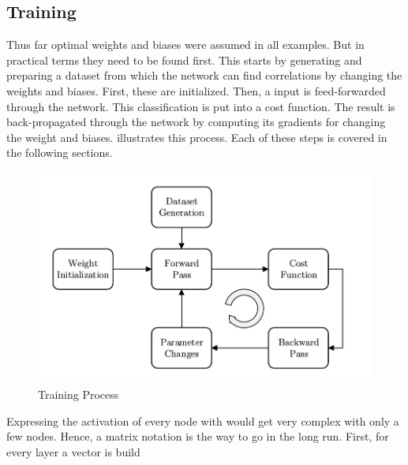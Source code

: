\subsection{Training}
\label{sec:neural-networks-training}
Thus far optimal weights and biases were assumed in all examples.
But in practical terms they need to be found first.
This starts by generating and preparing a dataset from which the network can find correlations by changing the weights and biases.
First, these are initialized.
Then, a input is feed-forwarded through the network.
This classification is put into a cost function.
The result is back-propagated through the network by computing its gradients for changing the weight and biases.
 illustrates this process.
Each of these steps is covered in the following sections.

\begin{figure}
	\centering
	\includegraphics{images/training.pdf}
	\caption[Training Process]{Training Process}
	\label{fig:training}
\end{figure}






Expressing the activation of every node with  would get very complex with only a few nodes.
Hence, a matrix notation is the way to go in the long run.
First, for every layer a vector is build